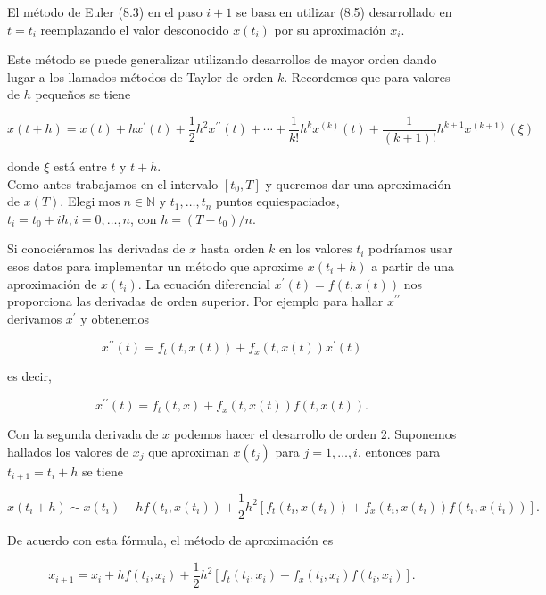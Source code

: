 \documentclass[10pt]{article}
\begin{document}
El método de Euler (8.3) en el paso $i+1$ se basa en utilizar (8.5) desarrollado en $t=t_{i}$ reemplazando el valor desconocido $x\left(t_{i}\right)$ por su aproximación $x_{i}$.

Este método se puede generalizar utilizando desarrollos de mayor orden dando lugar a los llamados métodos de Taylor de orden $k$. Recordemos que para valores de $h$ pequeños se tiene


\begin{equation*}
x(t+h)=x(t)+h x^{\prime}(t)+\frac{1}{2} h^{2} x^{\prime \prime}(t)+\cdots+\frac{1}{k!} h^{k} x^{(k)}(t)+\frac{1}{(k+1)!} h^{k+1} x^{(k+1)}(\xi) \tag{8.6}
\end{equation*}


donde $\xi$ está entre $t$ y $t+h$.\\
Como antes trabajamos en el intervalo $\left[t_{0}, T\right]$ y queremos dar una aproximación de $x(T)$. Elegi$\operatorname{mos} n \in \mathbb{N}$ y $t_{1}, \ldots, t_{n}$ puntos equiespaciados, $t_{i}=t_{0}+i h, i=0, \ldots, n$, con $h=\left(T-t_{0}\right) / n$.

Si conociéramos las derivadas de $x$ hasta orden $k$ en los valores $t_{i}$ podríamos usar esos datos para implementar un método que aproxime $x\left(t_{i}+h\right)$ a partir de una aproximación de $x\left(t_{i}\right)$. La ecuación diferencial $x^{\prime}(t)=f(t, x(t))$ nos proporciona las derivadas de orden superior. Por ejemplo para hallar $x^{\prime \prime}$ derivamos $x^{\prime}$ y obtenemos

$$
x^{\prime \prime}(t)=f_{t}(t, x(t))+f_{x}(t, x(t)) x^{\prime}(t)
$$

es decir,

$$
x^{\prime \prime}(t)=f_{t}(t, x)+f_{x}(t, x(t)) f(t, x(t)) .
$$

Con la segunda derivada de $x$ podemos hacer el desarrollo de orden 2. Suponemos hallados los valores de $x_{j}$ que aproximan $x\left(t_{j}\right)$ para $j=1, \ldots, i$, entonces para $t_{i+1}=t_{i}+h$ se tiene

$$
x\left(t_{i}+h\right) \sim x\left(t_{i}\right)+h f\left(t_{i}, x\left(t_{i}\right)\right)+\frac{1}{2} h^{2}\left[f_{t}\left(t_{i}, x\left(t_{i}\right)\right)+f_{x}\left(t_{i}, x\left(t_{i}\right)\right) f\left(t_{i}, x\left(t_{i}\right)\right)\right] .
$$

De acuerdo con esta fórmula, el método de aproximación es


\begin{equation*}
x_{i+1}=x_{i}+h f\left(t_{i}, x_{i}\right)+\frac{1}{2} h^{2}\left[f_{t}\left(t_{i}, x_{i}\right)+f_{x}\left(t_{i}, x_{i}\right) f\left(t_{i}, x_{i}\right)\right] . \tag{8.7}
\end{equation*}
\end{document}
